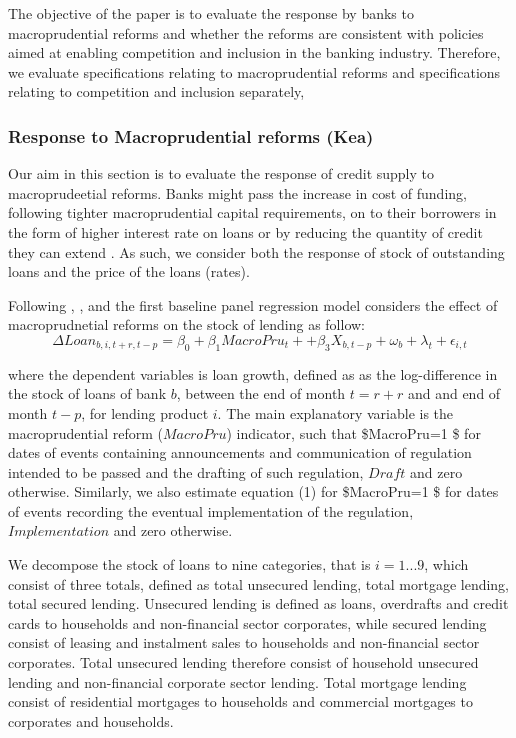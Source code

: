 \documentclass[
  letterpaper,
  DIV=11,
  numbers=noendperiod]{scrartcl}
\begin{document}
The objective of the paper is to evaluate the response by banks to
macroprudential reforms and whether the reforms are consistent with
policies aimed at enabling competition and inclusion in the banking
industry. Therefore, we evaluate specifications relating to
macroprudential reforms and specifications relating to competition and
inclusion separately,

\hypertarget{response-to-macroprudential-reforms-kea}{%
\subsubsection{Response to Macroprudential reforms
(Kea)}\label{response-to-macroprudential-reforms-kea}}

Our aim in this section is to evaluate the response of credit supply to
macroprudeetial reforms. Banks might pass the increase in cost of
funding, following tighter macroprudential capital requirements, on to
their borrowers in the form of higher interest rate on loans or by
reducing the quantity of credit they can extend
\citep{noss2016estimating}. As such, we consider both the response of
stock of outstanding loans and the price of the loans (rates).

Following \cite{aiyar2016does}, \cite{deli2017real}, \cite{fang2022bank}
and \cite{mirzaei2022effectiveness} the first baseline panel regression
model considers the effect of macroprudnetial reforms on the stock of
lending as follow: \begin{equation}
    \Delta Loan_{b,i,t+r,t-p}=\beta_{0}+ \beta_{1}MacroPru_{t}++\beta_{3}X_{b,t-p}+ \omega_{b}+ \lambda_{t}+\epsilon_{i,t}
\end{equation}

where the dependent variables is loan growth, defined as as the
log-difference in the stock of loans of bank \(b\), between the end of
month \(t=r+r\) and and end of month \(t-p\), for lending product \(i\).
The main explanatory variable is the macroprudential reform
(\(MacroPru\)) indicator, such that \$MacroPru=1 \$ for dates of events
containing announcements and communication of regulation intended to be
passed and the drafting of such regulation, \(Draft\) and zero
otherwise. Similarly, we also estimate equation (1) for \$MacroPru=1 \$
for dates of events recording the eventual implementation of the
regulation, \(Implementation\) and zero otherwise.

We decompose the stock of loans to nine categories, that is \(i=1...9\),
which consist of three totals, defined as total unsecured lending, total
mortgage lending, total secured lending. Unsecured lending is defined as
loans, overdrafts and credit cards to households and non-financial
sector corporates, while secured lending consist of leasing and
instalment sales to households and non-financial sector corporates.
Total unsecured lending therefore consist of household unsecured lending
and non-financial corporate sector lending. Total mortgage lending
consist of residential mortgages to households and commercial mortgages
to corporates and households.
\end{document}
